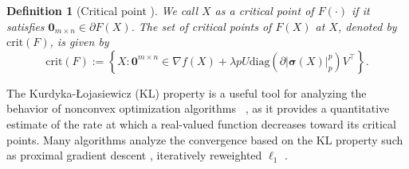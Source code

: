 \documentclass[twoside,11pt]{article}
\newtheorem{Def}{Definition}
\numberwithin{equation}{section}
\begin{document}
\begin{Def}[Critical point \cite{opt_simu_svd_2017}] We call $X$ as a critical point of $F(\cdot)$ if it satisfies $\bm{0}_{m\times{n} } \in\partial{F}(X)$. The set of critical points of $F (X) $ at $X$, denoted by $\mathrm{crit} (F) $, is given by
\begin{equation}\label{opt_pri_point}
  \mathrm{crit} (F) := \left\{X:\mathbf{0}^{m\times n}\in \nabla f (X) + \lambda p U\mathrm{diag} (\partial|\bm{\sigma} (X)|_{p}^{p})V^{\top} \right\}. 
\end{equation}
\end{Def}
The Kurdyka-{\L}ojasiewicz (KL) property is a useful tool for analyzing the behavior of nonconvex optimization algorithms~\cite{li2018calculus} , as it provides a quantitative estimate of the rate at which a real-valued function decreases toward its critical points. 
Many algorithms analyze the convergence based on the KL property such as proximal gradient descent \cite{KLForPGD_2018}, iteratively reweighted $\ell_{1}$ \cite{zenghao_lp2l1_adaEps_paper1}.
\end{document}
